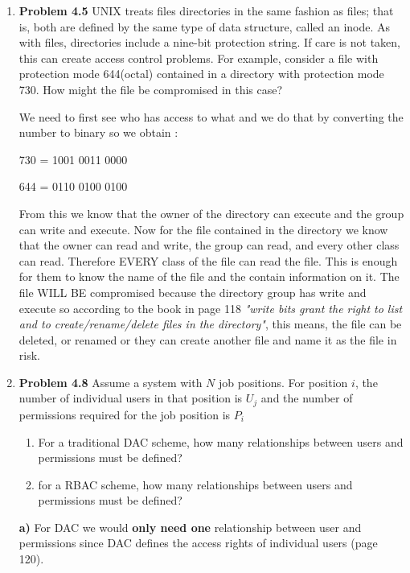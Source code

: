 \documentclass[12pt]{article}
\begin{document}
\begin{enumerate}
	\item {\textbf{Problem 4.5}  UNIX treats files directories in the same fashion as files; that is, both are defined by the same type of data structure, called an inode. As with files, directories include a nine-bit protection string. If care is not taken, this can create access control problems. For example, consider a file with protection mode 644(octal) contained in a directory with protection mode 730. How might the file be compromised in this case?}
	 
	 We need to first see who has access to what and we do that by converting the number to binary so we obtain : 
	 \begin{center} 730 =  1001 0011 0000 \end{center}
	 \begin{center} 644 =  0110 0100 0100 \end{center}
	 From this we know that the owner of the directory can execute and the group can write and execute. Now for the file contained in the directory we know that the owner can read and write,  the group can read,  and every other class can read. Therefore  EVERY class of the file can read the file. This is enough for them to know the name of the file and the contain information on it. The file WILL BE compromised because the directory group has write and execute so according to the book in page 118 \textit{"write bits grant the right to list and to create/rename/delete files in the directory"}, this means, the file can be deleted, or renamed or they can create another file and name it as the file in risk. 
	 	
	\vspace{10pt}
	
	\item {\textbf{Problem 4.8} Assume a system with $N$ job positions. For position $i$, the number of individual users in that position is $U_j$ and the number of permissions required for the job position is $P_i$ \begin{enumerate} \item{For a traditional DAC scheme, how many relationships between users and permissions must be defined?}
	\item{for a RBAC scheme, how many relationships between users and permissions must be defined?} \end{enumerate}}
	
	\textbf{a)} For DAC we would \textbf{only need one} relationship between user and permissions since DAC defines the access rights of individual users (page 120). \\
	

\end{enumerate}
\end{document}
